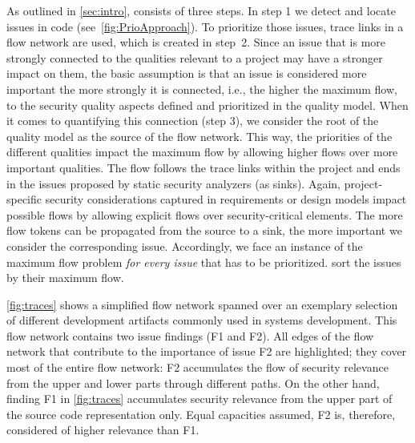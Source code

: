 As outlined in \autoref{sec:intro}, \appr{} consists of three steps.
In step 1 we detect and locate issues in code (see~\autoref{fig:PrioApproach}).
To prioritize those issues, trace links in a flow network are used, which is created in step~2.
Since an issue that is more strongly connected to the qualities relevant to a project may have a stronger impact on them, the basic assumption is that an issue is considered more important the more strongly it is connected, i.e., the higher the maximum flow, to the security quality aspects defined and prioritized in the quality model.
When it comes to quantifying this connection (step 3), we consider the root of the quality model as the source of the flow network.
This way, the priorities of the different qualities impact the maximum flow by allowing higher flows over more important qualities.
The flow follows the trace links within the project and ends in the issues proposed by static security analyzers (as sinks).
Again, project-specific security considerations captured in requirements or design models impact possible flows by allowing explicit flows over security-critical elements.
The more flow tokens can be propagated from the source to a sink, the more important we consider the corresponding issue.
Accordingly, we face an instance of the maximum flow problem \emph{for every issue} that has to be prioritized.
 sort the issues by their maximum flow.

\autoref{fig:traces} shows a simplified flow network spanned over an exemplary selection of different development artifacts commonly used in systems development.
This flow network contains two issue findings (F1 and F2).
All edges of the flow network that contribute to the importance of issue F2 are highlighted;
they cover most of the entire flow network: F2 accumulates the flow of security relevance from the upper and lower parts through different paths.
On the other hand, finding F1 in \autoref{fig:traces} accumulates security relevance from the upper part of the source code representation only.
Equal capacities assumed, F2 is, therefore, considered of higher relevance than F1.


